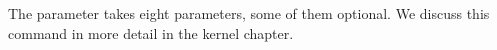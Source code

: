 The parameter takes eight parameters, some of them optional. We discuss this command in more detail in the kernel chapter.



\begin{teX}
\newcommand\section{\@startsection {section}{1}{\z@}%
                                   {-3.5ex \@plus -1ex \@minus -.2ex}%
                                   {2.3ex \@plus.2ex}%
                                   {\normalfont\Large\bfseries}}
\newcommand\subsection{\@startsection{subsection}{2}{\z@}%
                                     {-3.25ex\@plus -1ex \@minus -.2ex}%
                                     {1.5ex \@plus .2ex}%
                                     {\normalfont\large\bfseries}}
\newcommand\subsubsection{\@startsection{subsubsection}{3}{\z@}%
                                     {-3.25ex\@plus -1ex \@minus -.2ex}%
                                     {1.5ex \@plus .2ex}%
                                     {\normalfont\normalsize\bfseries}}
\newcommand\paragraph{\@startsection{paragraph}{4}{\z@}%
                                    {3.25ex \@plus1ex \@minus.2ex}%
                                    {-1em}%
                                    {\normalfont\normalsize\bfseries}}
\newcommand\subparagraph{\@startsection{subparagraph}{5}{\parindent}%
                                       {3.25ex \@plus1ex \@minus .2ex}%
                                       {-1em}%
                                      {\normalfont\normalsize\bfseries}}
\end{teX}                                      
